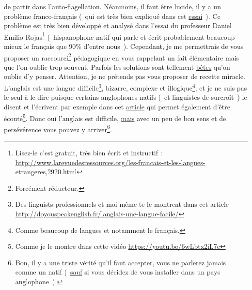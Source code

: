de partir dans l'auto-flagellation. Néanmoins, il faut être lucide, il
y a un problème franco-français (~qui est très bien expliqué dans cet
\href{http://www.larevuedesressources.org/les-francais-et-les-langues-etrangeres,2920.html}{essai}~). 
Ce problème est très bien développé et analysé dans l'essai du
professeur Daniel Emilio Rojas\footnote{Lisez-le c'est gratuit, très
  bien écrit et instructif : \url{http://www.larevuedesressources.org/les-francais-et-les-langues-etrangeres,2920.html}} (~hispanophone natif qui parle et écrit
probablement beaucoup mieux le français que 90\% d'entre
nous~). Cependant, je me permettrais de vous proposer un raccourci\footnote{Forcément réducteur.} pédagogique en vous rappelant un fait
élémentaire mais que l'on oublie trop souvent. Parfois les solutions
sont tellement \underline{bêtes} qu'on oublie d'y penser. Attention, je ne
prétends pas vous proposer de recette miracle. L'anglais est une
langue difficile\footnote{Des \glspl{linguist} professionnels et moi-même te
  le montrent dans cet article \url{http://doyouspeakenglish.fr/langlais-une-langue-facile/} }, bizarre, complexe et
illogique\footnote{Comme beaucoup de langues et notamment le
  français.}; et je ne suis pas le seul à le dire puisque certains anglophones natifs (~et
linguistes de surcroît~) le disent et l'écrivent par exemple dans cet \href{http://doyouspeakenglish.fr/langlais-une-langue-facile/}{article} qui permet également d'être
écouté\footnote{Comme je le montre dans cette vidéo
  \url{https://youtu.be/6wLbtx2iL7c}}. Donc oui l'anglais est
difficile, \underline{mais} avec un peu de bon sens et de persévérence
vous pouvez y arriver\footnote{Bon, il y a une triste vérité qu'il
  faut accepter, vous ne parlerez \underline{jamais} comme un natif (~\underline{sauf}
  si vous décidez de vous installer dans un pays anglophone~).}. 

\newpage
